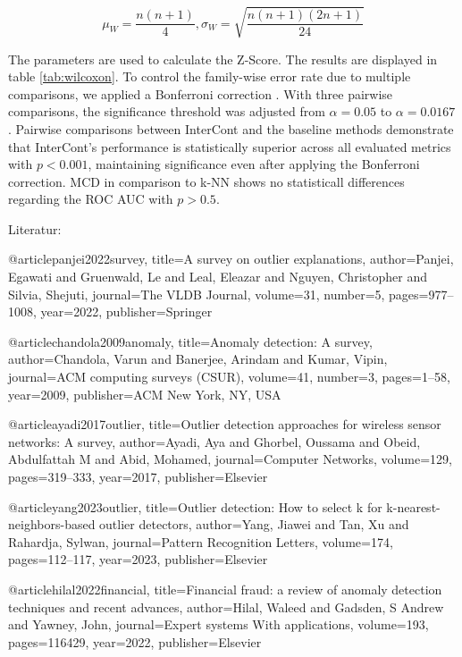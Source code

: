 \begin{equation}
    \mu_W = \frac{n(n+1)}{4} , \sigma_W = \sqrt{\frac{n(n+1)(2n+1)}{24}}
\end{equation}

The parameters are used to calculate the Z-Score.
The results are displayed in table \ref{tab:wilcoxon}.
To control the family-wise error rate due to multiple comparisons, we applied a Bonferroni correction \citep[p. 52]{dunn1961multiple}. 
With three pairwise comparisons, the significance threshold was adjusted from $\alpha = 0.05$ to $\alpha = 0.0167$.
Pairwise comparisons between InterCont and the baseline methods demonstrate that InterCont's performance is statistically superior across all evaluated metrics with $p < 0.001$, maintaining significance even after applying the Bonferroni correction. 
MCD in comparison to k-NN shows no statisticall differences regarding the ROC AUC with $p > 0.5$.


Literatur:


@article{panjei2022survey,
  title={A survey on outlier explanations},
  author={Panjei, Egawati and Gruenwald, Le and Leal, Eleazar and Nguyen, Christopher and Silvia, Shejuti},
  journal={The {VLDB} Journal},
  volume={31},
  number={5},
  pages={977--1008},
  year={2022},
  publisher={Springer}
}

@article{chandola2009anomaly,
  title={Anomaly detection: A survey},
  author={Chandola, Varun and Banerjee, Arindam and Kumar, Vipin},
  journal={ACM computing surveys (CSUR)},
  volume={41},
  number={3},
  pages={1--58},
  year={2009},
  publisher={ACM New York, NY, USA}
}

@article{ayadi2017outlier,
  title={Outlier detection approaches for wireless sensor networks: A survey},
  author={Ayadi, Aya and Ghorbel, Oussama and Obeid, Abdulfattah M and Abid, Mohamed},
  journal={Computer Networks},
  volume={129},
  pages={319--333},
  year={2017},
  publisher={Elsevier}
}

@article{yang2023outlier,
  title={Outlier detection: How to select k for k-nearest-neighbors-based outlier detectors},
  author={Yang, Jiawei and Tan, Xu and Rahardja, Sylwan},
  journal={Pattern Recognition Letters},
  volume={174},
  pages={112--117},
  year={2023},
  publisher={Elsevier}
}

@article{hilal2022financial,
  title={Financial fraud: a review of anomaly detection techniques and recent advances},
  author={Hilal, Waleed and Gadsden, S Andrew and Yawney, John},
  journal={Expert systems With applications},
  volume={193},
  pages={116429},
  year={2022},
  publisher={Elsevier}
}


